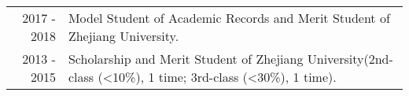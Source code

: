 %
%





\begin{tabular}{rl}	
	\textsc{2017 - 2018} & Model Student of Academic Records and Merit Student of Zhejiang University.\\
	\textsc{2013 - 2015} & Scholarship and Merit Student of Zhejiang University(2nd-class (<10\%), 1 time; 3rd-class (<30\%), 1 time).\\	
\end{tabular}
